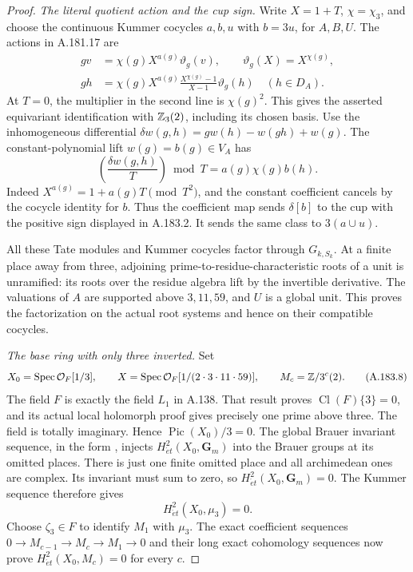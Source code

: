 \begin{proof}
\emph{The literal quotient action and the cup sign.}
Write \(X=1+T\), \(\chi=\chi_3\), and choose the continuous
Kummer cocycles \(a,b,u\) with \(b=3u\), for \(A,B,U\).
The actions in A.181.17 are
\[
\begin{aligned}
 g v&=\chi(g)X^{a(g)}\vartheta_g(v),\qquad
                    \vartheta_g(X)=X^{\chi(g)},\\
 g h&=\chi(g)X^{a(g)}
       \frac{X^{\chi(g)}-1}{X-1}\vartheta_g(h)
                    \quad(h\in D_A).
\end{aligned}
\tag{A.183.6}
\]
At \(T=0\), the multiplier in the second line is
\(\chi(g)^2\).  This gives the asserted equivariant
identification with \(\mathbb Z_3(2)\), including its chosen basis.
Use the inhomogeneous differential
\(\delta w(g,h)=g w(h)-w(gh)+w(g)\).
The constant-polynomial lift \(w(g)=b(g)\in V_A\) has
\[
 \left(\frac{\delta w(g,h)}{T}\right)\bmod T
     =a(g)\chi(g)b(h).
\tag{A.183.7}
\]
Indeed \(X^{a(g)}=1+a(g)T\pmod {T^2}\), and the constant
coefficient cancels by the cocycle identity for \(b\).
Thus the coefficient map sends \(\delta[b]\) to the cup
with the positive sign displayed in A.183.2.
It sends the same class to \(3(a\cup u)\).

All these Tate modules and Kummer cocycles factor through
\(G_{k,S_k}\).  At a finite place away from three, adjoining
prime-to-residue-characteristic roots of a unit is unramified:
its roots over the residue algebra lift by the invertible
derivative.  The valuations of \(A\) are supported above
\(3,11,59\), and \(U\) is a global unit.  This proves the
factorization on the actual root systems and hence on their
compatible cocycles.

\emph{The base ring with only three inverted.}
Set
\[
 X_0=\operatorname{Spec}\mathcal O_F[1/3],\qquad
 X=\operatorname{Spec}\mathcal O_F[1/(2\cdot3\cdot11\cdot59)],
 \qquad M_c=\mathbb Z/3^c(2).
\tag{A.183.8}
\]
The field \(F\) is exactly the field \(L_1\) in A.138.
That result proves \(\operatorname{Cl}(F)\{3\}=0\), and its actual local
holomorph proof gives precisely one prime above three.
The field is totally imaginary.  Hence
\(\operatorname{Pic}(X_0)/3=0\).
The global Brauer invariant sequence, in the form
\cite[II, Proposition 2.1]{BIR_MilneADT}, injects
\(H^2_{\acute et}(X_0,\mathbf G_m)\) into the Brauer groups
at its omitted places.  There is just one finite omitted
place and all archimedean ones are complex.  Its invariant
must sum to zero, so
\(H^2_{\acute et}(X_0,\mathbf G_m)=0\).
The Kummer sequence therefore gives
\[
 H^2_{\acute et}(X_0,\mu_3)=0.
\tag{A.183.9}
\]
Choose \(\zeta_3\in F\) to identify \(M_1\) with \(\mu_3\).
The exact coefficient sequences
\(0\to M_{c-1}\to M_c\to M_1\to0\)
and their long exact cohomology sequences now prove
\(H^2_{\acute et}(X_0,M_c)=0\) for every \(c\).


\end{proof}
